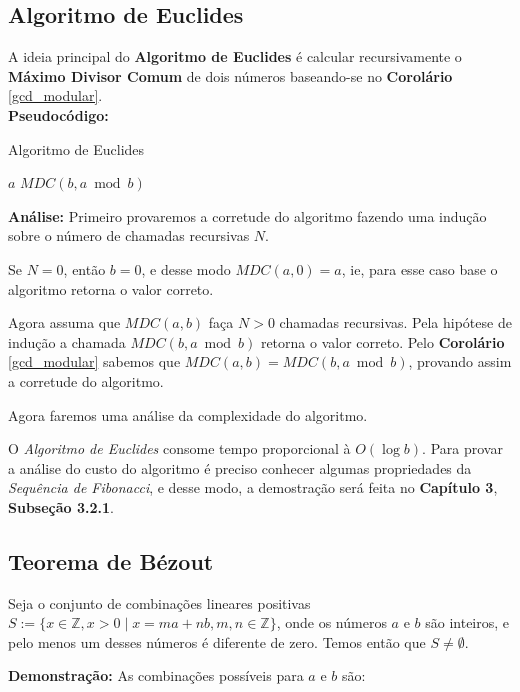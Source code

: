 \subsection{Algoritmo de Euclides}\label{algoritmo_de_euclides_subsessao}
A ideia principal do \textbf{Algoritmo de Euclides} é calcular recursivamente o \textbf{Máximo Divisor Comum} de dois números baseando-se no 
\textbf{Corolário} \autoref{gcd_modular}.\\

\textbf{Pseudocódigo:}
\begin{algorithm}
\caption{Algoritmo de Euclides}\label{mdc}
\begin{algorithmic}[1]
\State \Return $a$
\EndIf
\State \Return $MDC(b, a \bmod b)$
\EndProcedure
\end{algorithmic}
\end{algorithm}

\textbf{Análise:}
Primeiro provaremos a corretude do algoritmo fazendo uma indução sobre o número de chamadas recursivas $N$.

Se $N=0$, então $b=0$, e desse modo $MDC(a,0)=a$, ie, para esse caso base o algoritmo retorna o valor correto.

Agora assuma que $MDC(a,b)$ faça $N>0$ chamadas recursivas. Pela hipótese de indução a chamada $MDC(b, a \bmod b)$ retorna o valor correto. Pelo \textbf{Corolário} \autoref{gcd_modular} sabemos que $MDC(a,b) = MDC(b, a \bmod b)$, provando assim a corretude do algoritmo.

Agora faremos uma análise da complexidade do algoritmo.

O \textit{Algoritmo de Euclides} consome tempo proporcional à $O(\log b)$. Para provar a análise do custo do algoritmo é preciso conhecer algumas propriedades da \textit{Sequência de Fibonacci}, e desse modo, a 
demostração será feita no \textbf{Capítulo 3}, \textbf{Subseção 3.2.1}.



\subsection{Teorema de Bézout}

\begin{proposition}\label{bezout_conjunto_nao_nulo}
Seja o conjunto de combinações lineares positivas $S := \{x\in\mathbb{Z}, x>0 \mid x = ma + nb, m,n\in \mathbb{Z}\}$, onde os números $a$ e $b$ são inteiros, 
e pelo menos um desses números é diferente de zero. Temos então que $S \neq \emptyset$. 
\end{proposition}
\textbf{Demonstração:}
As combinações possíveis para $a$ e $b$ são:

